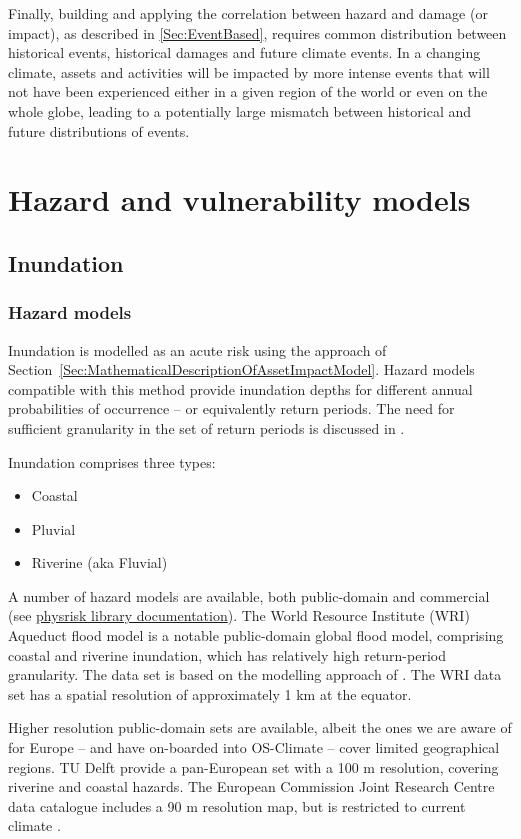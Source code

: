\documentclass[a4paper,11pt]{extarticle} %
\theoremstyle{definition}
\begin{document}
Finally, building and applying the correlation between hazard and damage (or impact), as described in \ref{Sec:EventBased}, requires common distribution between historical events, historical damages and future climate events. In a changing climate, assets and activities will be impacted by more intense events that will not have been experienced either in a given region of the world or even on the
whole globe, leading to a potentially large mismatch between historical and future distributions of events.


\section{Hazard and vulnerability models}

\subsection{Inundation}
\subsubsection{Hazard models}
Inundation is modelled as an acute risk using the approach of Section~\ref{Sec:MathematicalDescriptionOfAssetImpactModel}. Hazard models compatible with this method provide inundation depths for different annual probabilities of occurrence -- or equivalently return periods. The need for sufficient granularity in the set of return periods is discussed in \cite{WardEtAl:2011}.

Inundation comprises three types:
\begin{itemize}
\item Coastal
\item Pluvial
\item Riverine (aka Fluvial)
\end{itemize}

A number of hazard models are available, both public-domain and commercial (see \href{https://physrisk.readthedocs.io/en/latest/}{physrisk library documentation}). The World Resource Institute (WRI) Aqueduct flood model \cite{WardEtAl:2020} is a notable public-domain global flood model, comprising coastal and riverine inundation, which has relatively high return-period granularity. The data set is based on the modelling approach of \cite{WardEtAl:2013}. The WRI data set has a spatial resolution of approximately 1 km at the equator.

Higher resolution public-domain sets are available, albeit the ones we are aware of for Europe -- and have on-boarded into OS-Climate -- cover limited geographical regions. TU Delft provide a pan-European set \cite{PaprotnyEtAl:2016} with a 100 m resolution, covering riverine and coastal hazards. The European Commission Joint Research Centre data catalogue includes a 90 m resolution map, but is restricted to current climate \cite{DottoriEtAl:2016}.
\end{document}
